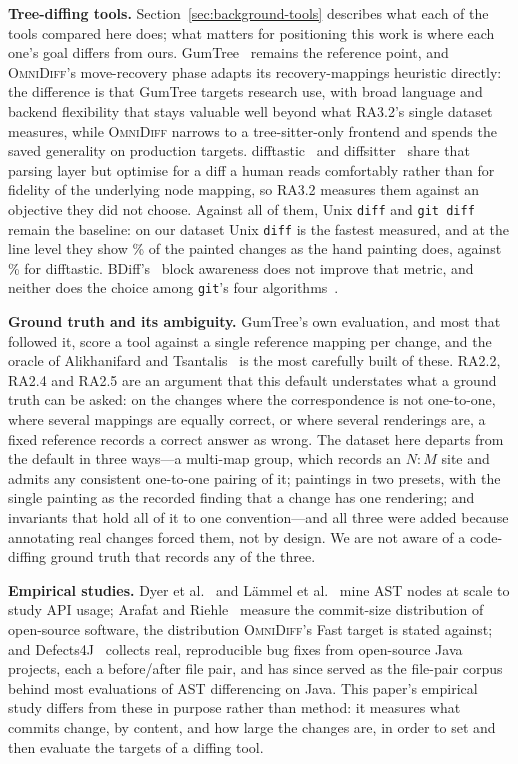 \documentclass[sigconf,review]{acmart}
\begin{document}
\textbf{Tree-diffing tools.} Section~\ref{sec:background-tools} describes what each of the tools
compared here does; what matters for positioning this work is where each one's goal differs from
ours. GumTree~\cite{gumtreediff-2014} remains the reference point, and \textsc{OmniDiff}'s
move-recovery phase adapts its recovery-mappings heuristic directly: the difference is that
GumTree targets research use, with broad language and backend flexibility that stays valuable
well beyond what RA3.2's single dataset measures, while \textsc{OmniDiff} narrows to a
tree-sitter-only frontend and spends the saved generality on production targets.
difftastic~\cite{difftastic} and diffsitter~\cite{diffsitter} share that parsing layer but
optimise for a diff a human reads comfortably rather than for fidelity of the underlying node
mapping, so RA3.2 measures them against an objective they did not choose. Against all of them,
Unix \texttt{diff} and \texttt{git diff}~\cite{myers-1986} remain the baseline: on our dataset
Unix \texttt{diff} is the fastest measured, and at the line level they show
\UnixDiffPaintingLinePerfectPct{}\% of the painted changes as the hand painting does, against
\DifftasticPaintingLinePerfectPct{}\% for difftastic. BDiff's~\cite{bdiff} block awareness does not
improve that metric, and neither does the choice among \texttt{git}'s four
algorithms~\cite{nugroho-histogram}.

\textbf{Ground truth and its ambiguity.} GumTree's own evaluation, and most that followed it,
score a tool against a single reference mapping per change, and the oracle of Alikhanifard and
Tsantalis~\cite{astdiffbenchmark} is the most carefully built of these. RA2.2, RA2.4 and RA2.5 are
an argument that this default understates what a ground truth can be asked: on the changes where
the correspondence is not one-to-one, where several mappings are equally correct, or where several
renderings are, a fixed reference records a correct answer as wrong. The dataset here departs from
the default in three ways---a multi-map group, which records an $N{:}M$ site and admits any
consistent one-to-one pairing of it; paintings in two presets, with the single painting as the
recorded finding that a change has one rendering; and invariants that hold all of it to one
convention---and all three were added because annotating real changes forced them, not by design.
We are not aware of a code-diffing ground truth that records any of the three.

\textbf{Empirical studies.} Dyer et al.~\cite{ast-api-1} and L\"{a}mmel et al.~\cite{ast-api-2}
mine AST nodes at scale to study API usage; Arafat and
Riehle~\cite{commit-size-distribution-paper} measure the commit-size distribution of open-source
software, the distribution \textsc{OmniDiff}'s Fast target is stated against; and
Defects4J~\cite{defects4j} collects real, reproducible bug fixes from open-source Java projects,
each a before/after file pair, and has since served as the file-pair corpus behind most
evaluations of AST differencing on Java. This paper's empirical study differs from these in
purpose rather than method: it measures what commits change, by content, and how large the
changes are, in order to set and then evaluate the targets of a diffing tool.
\end{document}
